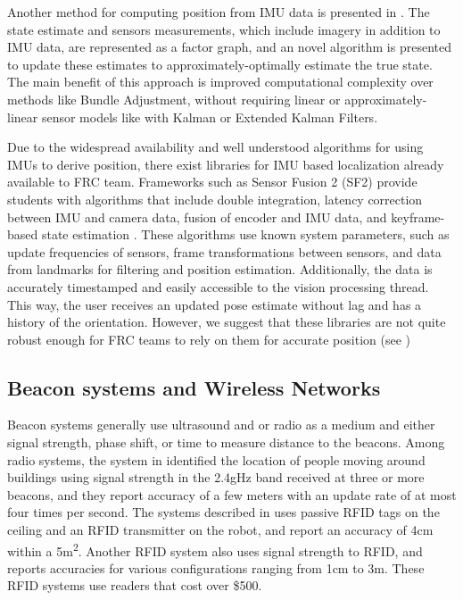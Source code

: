 \documentclass{article}
\begin{document}
    Another method for computing position from IMU data is presented in \cite{vadim_indelman_information_2013}. The state estimate and sensors measurements, which include imagery in addition to IMU data, are represented as a factor graph, and an novel algorithm is presented to update these estimates to approximately-optimally estimate the true state. The main benefit of this approach is improved computational complexity over methods like Bundle Adjustment, without requiring linear or approximately-linear sensor models like with Kalman or Extended Kalman Filters.

    Due to the widespread availability and well understood algorithms for using IMUs to derive position, there exist libraries for IMU based localization already available to FRC team. Frameworks such as Sensor Fusion 2 (SF2) provide students with algorithms that include double integration, latency correction between IMU and camera data, fusion of encoder and IMU data, and keyframe-based state estimation \cite{kauai_labs_inc_video_2017}. These algorithms use known system parameters, such as update frequencies of sensors, frame transformations between sensors, and data from landmarks for filtering and position estimation. Additionally, the data is accurately timestamped and easily accessible to the vision processing thread. This way, the user receives an updated pose estimate without lag and has a history of the orientation. However, we suggest that these libraries are not quite robust enough for FRC teams to rely on them for accurate position (see )

  \subsection{Beacon systems and Wireless Networks} \label{section:beacons_background}

    Beacon systems generally use ultrasound and or radio as a medium and either signal strength, phase shift, or time to measure distance to the beacons. Among radio systems, the system in \cite{bahl_radar:_2000} identified the location of people moving around buildings using signal strength in the 2.4gHz band received at three or more beacons, and they report accuracy of a few meters with an update rate of at most four times per second. The systems described in \cite{digiampaolo_mobile_2014} uses passive RFID tags on the ceiling and an RFID transmitter on the robot, and report an accuracy of 4\si{\centi\meter} within a 5\si{\square\meter}. Another RFID system \cite{saab_standalone_2011} also uses signal strength to RFID, and reports accuracies for various configurations ranging from 1\si{\centi\meter} to 3\si{\meter}. These RFID systems use readers that cost over \$500.
\end{document}
